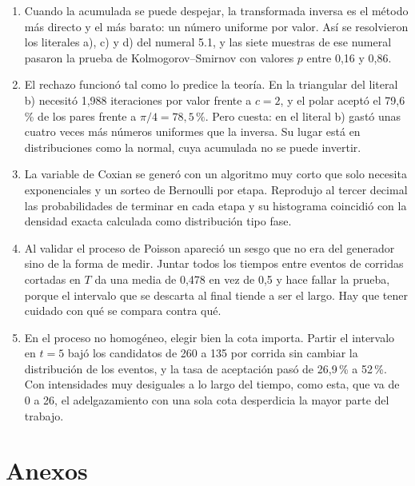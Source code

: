 \documentclass[11pt,letterpaper]{article}
\begin{document}
\begin{enumerate}[itemsep=4pt]

\item Cuando la acumulada se puede despejar, la transformada inversa es el método más directo y el
más barato: un número uniforme por valor. Así se resolvieron los literales a), c) y d) del numeral 5.1,
y las siete muestras de ese numeral pasaron la prueba de Kolmogorov--Smirnov con valores $p$ entre
0,16 y 0,86.

\item El rechazo funcionó tal como lo predice la teoría. En la triangular del literal b) necesitó
1,988 iteraciones por valor frente a $c = 2$, y el polar aceptó el 79,6\,\% de los pares frente a
$\pi/4 = 78{,}5\,\%$. Pero cuesta: en el literal b) gastó unas cuatro veces más números uniformes que
la inversa. Su lugar está en distribuciones como la normal, cuya acumulada no se puede invertir.

\item La variable de Coxian se generó con un algoritmo muy corto que solo necesita exponenciales y
un sorteo de Bernoulli por etapa. Reprodujo al tercer decimal las probabilidades de terminar en cada
etapa y su histograma coincidió con la densidad exacta calculada como distribución tipo fase.

\item Al validar el proceso de Poisson apareció un sesgo que no era del generador sino de la forma de
medir. Juntar todos los tiempos entre eventos de corridas cortadas en $T$ da una media de 0,478 en
vez de 0,5 y hace fallar la prueba, porque el intervalo que se descarta al final tiende a ser el
largo. Hay que tener cuidado con qué se compara contra qué.

\item En el proceso no homogéneo, elegir bien la cota importa. Partir el intervalo en $t = 5$ bajó
los candidatos de 260 a 135 por corrida sin cambiar la distribución de los eventos, y la tasa de
aceptación pasó de 26,9\,\% a 52\,\%. Con intensidades muy desiguales a lo largo del tiempo, como
esta, que va de 0 a 26, el adelgazamiento con una sola cota desperdicia la mayor parte del trabajo.

\end{enumerate}

\section{Anexos}
\end{document}
